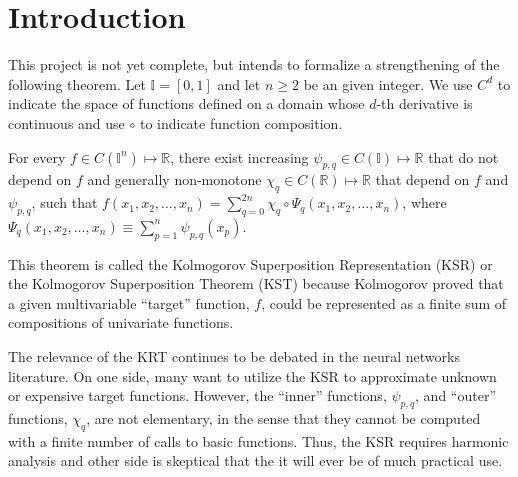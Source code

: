 %

\chapter{Introduction}

This project is not yet complete, but intends to formalize a strengthening of the following theorem. Let $\mathbb{I} = \left[0,1\right]$ and let $n \geq 2$ be an given integer. We use $C^d$ to indicate the space of functions defined on a domain whose $d$-th derivative is continuous and use $\circ$ to indicate function composition.

\begin{theorem*}[Kolmogorov 1957]
  \label{thm:KST}
  For every $f \in C\left(\mathbb{I}^n\right) \mapsto \mathbb{R}$, there exist increasing $\psi_{p,q} \in C\left(\mathbb{I}\right) \mapsto \mathbb{R}$ that do not depend on $f$ and generally non-monotone $\chi_q \in C\left(\mathbb{R}\right) \mapsto \mathbb{R}$ that depend on $f$ and $\psi_{p,q}$, such that $f\left(x_1, x_2, \dots, x_n\right) = \sum\limits_{q = 0}^{2n} \chi_q \circ \Psi_q\left(x_1, x_2, \dots, x_n\right)$, where $\Psi_q\left(x_1, x_2, \dots, x_n\right) \equiv \sum\limits_{p = 1}^n \psi_{p,q}\left(x_p\right)$.
\end{theorem*}

\noindent This theorem is called the Kolmogorov Superposition Representation (KSR) or the Kolmogorov Superposition Theorem (KST) because Kolmogorov proved that a given multivariable ``target'' function, $f$, could be represented as a finite sum of compositions of univariate functions. 

The relevance of the KRT continues to be debated in the neural networks literature. On one side, many want to utilize the KSR to approximate unknown or expensive target functions. However, the ``inner'' functions, $\psi_{p,q}$, and ``outer'' functions, $\chi_q$, are not elementary, in the sense that they cannot be computed with a finite number of calls to basic functions. Thus, the KSR requires harmonic analysis and other side is skeptical that the it will ever be of much practical use.


